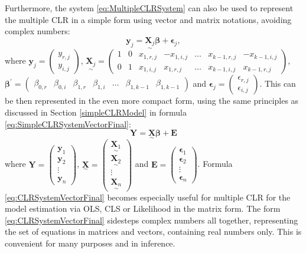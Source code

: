 \documentclass[
]{book}
\begin{document}
Furthermore, the system \eqref{eq:MultipleCLRSystem} can also be used to represent the multiple CLR in a simple form using vector and matrix notations, avoiding complex numbers:
\begin{equation}
    \mathbf{y}_j = \underset{\sim}{\mathbf{X}_j} \boldsymbol{\beta} + \boldsymbol{\epsilon}_j ,
    \label{eq:MultipleCLRSystemVector}
\end{equation}
where \(\mathbf{y}_j = \begin{pmatrix} y_{r,j} \\ y_{i,j} \end{pmatrix}\), \(\underset{\sim}{\mathbf{X}_j} = \begin{pmatrix} 1 & 0 & x_{1,r,j} & -x_{1,i,j} & \dots & x_{k-1,r,j} & -x_{k-1,i,j} \\ 0 & 1 & x_{1,i,j} & x_{1,r,j} & \dots & x_{k-1,i,j} & x_{k-1,r,j} \end{pmatrix}\), \(\boldsymbol{\beta}^\prime = \begin{pmatrix} \beta_{0,r} & \beta_{0,i} & \beta_{1,r} & \beta_{1,i} & \dots & \beta_{1,k-1} & \beta_{1,k-1} \end{pmatrix}\) and \(\mathbf{\epsilon}_j = \begin{pmatrix} \epsilon_{r,j} \\ \epsilon_{i,j} \end{pmatrix}\). This can be then represented in the even more compact form, using the same principles as discussed in Section \ref{simpleCLRModel} in formula \eqref{eq:SimpleCLRSystemVectorFinal}:
\begin{equation}
    \mathbf{Y} = \underset{\sim}{\mathbf{X}} \boldsymbol{\beta} + \mathbf{E} 
    \label{eq:CLRSystemVectorFinal}
\end{equation}
where \(\mathbf{Y}=\begin{pmatrix}\mathbf{y}_1 \\ \mathbf{y}_2\\ \vdots \\ \mathbf{y}_n \end{pmatrix}\), \(\underset{\sim}{\mathbf{X}}=\begin{pmatrix} \underset{\sim}{\mathbf{X}_1} \\ \underset{\sim}{\mathbf{X}_2} \\ \vdots \\ \underset{\sim}{\mathbf{X}_n} \end{pmatrix}\) and \(\mathbf{E}=\begin{pmatrix}\boldsymbol{\epsilon}_1 \\ \boldsymbol{\epsilon}_2\\ \vdots \\ \boldsymbol{\epsilon}_n \end{pmatrix}\). Formula \eqref{eq:CLRSystemVectorFinal} becomes especially useful for multiple CLR for the model estimation via OLS, CLS or Likelihood in the matrix form. The form \eqref{eq:CLRSystemVectorFinal} sidesteps complex numbers all together, representing the set of equations in matrices and vectors, containing real numbers only. This is convenient for many purposes and in inference.
\end{document}
